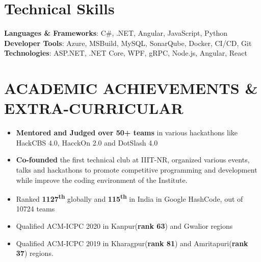 \documentclass[letterpaper,11pt]{article}
\newcommand{\achievementItem}[1]{
  \item\small{
    {#1 \vspace{-6pt}}
  }
}
\begin{document}
%
\section{Technical Skills}
 \begin{itemize}[leftmargin=0.15in, label={}]
    {\item{
     \textbf{Languages \& Frameworks}{: C\#, .NET, Angular, JavaScript, Python} \\
     \vspace{1pt}
     \textbf{Developer Tools}{: Azure, MSBuild, MySQL, SonarQube, Docker, CI/CD, Git} \\
     \vspace{1pt}
     \textbf{Technologies}{: ASP.NET, .NET Core, WPF, gRPC, Node.js, Angular, React} \\
    }}
 \end{itemize}
 \vspace{-16pt}



\section{ACADEMIC ACHIEVEMENTS \& EXTRA-CURRICULAR}

\begin{itemize}[leftmargin=0.2in]
  \achievementItem{\textbf{Mentored and Judged over 50+ teams} in various hackathons like HackCBS 4.0, HacckOn 2.0 and DotSlash 4.0}
  \achievementItem{\textbf{Co-founded}  the  first  technical  club  at  IIIT-NR,  organized  various  events, talks and hackathons to  promote competitive programming and development while improve the coding environment of the Institute.}
  \achievementItem{Ranked \textbf{1127\textsuperscript{th}} globally and \textbf{115\textsuperscript{th}} in India in Google HashCode, out of 10724 teams}
  \achievementItem{Qualified ACM-ICPC 2020 in Kanpur(\textbf{rank 63}) and Gwalior regions}
  \achievementItem{Qualified ACM-ICPC 2019 in Kharagpur(\textbf{rank 81}) and Amritapuri(\textbf{rank 37}) regions.}
\end{itemize}
\end{document}
